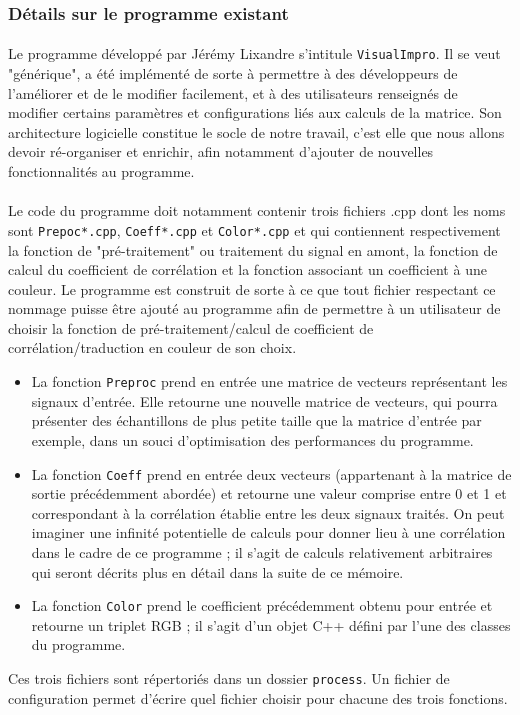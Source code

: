 \subsubsection{Détails sur le programme existant}
\paragraph{}
Le programme développé par Jérémy Lixandre s'intitule
\verb!VisualImpro!. Il se veut "générique", a été implémenté de sorte
à permettre à des développeurs de l'améliorer et de le modifier
facilement, et à des utilisateurs renseignés de modifier certains
paramètres et configurations liés aux calculs de la matrice. Son
architecture logicielle constitue le socle de notre travail, c'est
elle que nous allons devoir ré-organiser et enrichir, afin notamment
d'ajouter de nouvelles fonctionnalités au programme.
\paragraph{}
Le code du programme doit notamment contenir trois fichiers .cpp dont
les noms sont \verb!Prepoc*.cpp!, \verb!Coeff*.cpp! et
\verb!Color*.cpp! et qui contiennent respectivement la fonction de
"pré-traitement" ou traitement du signal en amont, la fonction de
calcul du coefficient de corrélation et la fonction associant un
coefficient à une couleur. Le programme est construit de sorte à ce
que tout fichier respectant ce nommage puisse être ajouté au programme
afin de permettre à un utilisateur de choisir la fonction de
pré-traitement/calcul de coefficient de
corrélation/traduction en couleur de son choix.
\begin{itemize}
 \item La fonction \verb!Preproc! prend en entrée une matrice de
       vecteurs représentant les signaux d'entrée. Elle retourne une
       nouvelle matrice de vecteurs, qui pourra présenter des
       échantillons de plus petite taille que la matrice d'entrée par
       exemple, dans un souci d'optimisation des performances du
       programme.
 \item La fonction \verb!Coeff! prend en entrée deux vecteurs
       (appartenant à la matrice de sortie précédemment abordée) et
       retourne une valeur comprise entre 0 et 1 et correspondant à la
       corrélation établie entre les deux signaux traités. On peut
       imaginer une infinité potentielle de calculs pour donner lieu à
       une corrélation dans le cadre de ce programme ; il s'agit de
       calculs relativement arbitraires qui seront décrits plus en détail
       dans la suite de ce mémoire.
 \item La fonction \verb!Color! prend le coefficient précédemment obtenu
       pour entrée et retourne un triplet RGB ; il s'agit d'un objet C++
       défini par l'une des classes du programme.
\end{itemize}
Ces trois fichiers sont répertoriés dans un dossier \verb!process!. Un
fichier de configuration permet d'écrire quel fichier choisir pour
chacune des trois fonctions.

